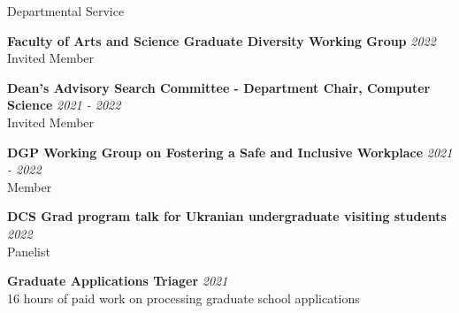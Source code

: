 \documentclass{resume}
\newcommand{\cvitem}[3]{
    {\bf #1} \hfill {\em \small #2} \\ 
    {\small#3 }
}
\begin{document}
\begin{rSection}{Departmental Service}

    
\cvitem{Faculty of Arts and Science Graduate Diversity Working Group}{2022}{Invited Member}

\cvitem{Dean's Advisory Search Committee -  Department Chair, Computer Science}{2021 - 2022}{Invited Member}

\cvitem{DGP Working Group on Fostering a Safe and Inclusive Workplace}{2021 - 2022}{Member}

\cvitem{DCS Grad program talk for Ukranian undergraduate visiting students}{2022}{Panelist}

\cvitem{Graduate Applications Triager}{2021}{16 hours of paid work on processing graduate school applications}




\end{rSection}
\end{document}
